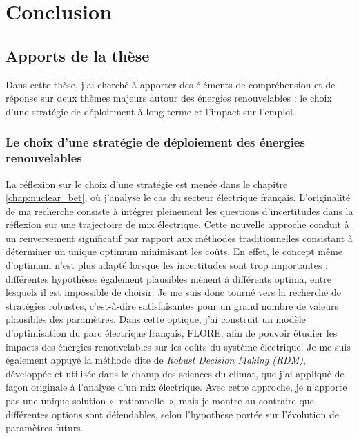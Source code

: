 \chapter{Conclusion} \label{chap:conclusion}

\section{Apports de la thèse}

Dans cette thèse, j’ai cherché à apporter des éléments de compréhension et de réponse sur deux thèmes majeurs autour des énergies renouvelables : le choix d’une stratégie de déploiement à long terme et l'impact sur l’emploi. 

\subsection{Le choix d'une stratégie de déploiement des énergies renouvelables}

La réflexion sur le choix d’une stratégie est menée dans le chapitre \ref{chap:nuclear_bet}, où j'analyse le cas du secteur électrique français. L’originalité de ma recherche consiste à intégrer pleinement les questions d’incertitudes dans la réflexion sur une trajectoire de mix électrique.
Cette nouvelle approche conduit à un renversement significatif par rapport aux méthodes traditionnelles consistant à déterminer un unique optimum minimisant les coûts. En effet, le concept même d’optimum n’est plus adapté lorsque les incertitudes sont trop importantes : différentes hypothèses également plausibles mènent à différents optima, entre lesquels il est impossible de choisir. Je me suis donc tourné vers la recherche de stratégies robustes, c’est-à-dire satisfaisantes pour un grand nombre de valeurs plausibles des paramètres. 
Dans cette optique, j'ai construit un modèle d'optimisation du parc électrique français, FLORE, afin de pouvoir étudier les impacts des énergies renouvelables sur les coûts du système électrique. Je me suis également appuyé la méthode dite de \textit{Robust Decision Making (RDM)}, développée et utilisée dans le champ des sciences du climat, que j'ai appliqué de façon originale à l'analyse d'un mix électrique. 
Avec cette approche, je n’apporte pas une unique solution «~rationnelle~», mais je montre au contraire que différentes options sont défendables, selon l’hypothèse portée sur l’évolution de paramètres futurs. 

